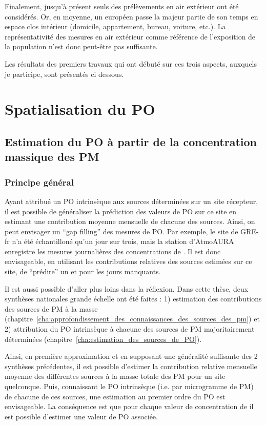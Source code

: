 Finalement, jusqu'à présent seuls des prélèvements en air extérieur ont été considérés.
Or, en moyenne, un européen passe la majeur partie de son temps en espace clos intérieur
(domicile, appartement, bureau, voiture, etc.).  La représentativité des mesures en air
extérieur comme référence de l'exposition de la population n'est donc peut-être pas
suffisante.

Les résultats des premiers travaux qui ont débuté sur ces trois aspects, auxquels je
participe, sont présentés ci dessous.

\section{Spatialisation du PO}

\subsection{Estimation du PO à partir de la concentration massique des PM}

\subsubsection{Principe général}

Ayant attribué un PO intrinsèque aux sources déterminées sur un site récepteur, il est
possible de généraliser la prédiction des valeurs de PO sur ce site en estimant une
contribution moyenne mensuelle de chacune des sources. Ainsi, on peut envisager un ``gap
filling'' des mesures de PO. Par exemple, le site de GRE-fr n'a été échantilloné qu'un
jour sur trois, mais la station d'AtmoAURA enregistre les mesures journalières des
concentrations de \PMdix. Il est donc envisageable, en utilisant les contributions
relatives des sources estimées sur ce site, de ``prédire'' un \POAAv{} et \PODTTv{} pour
les jours manquants.

Il est aussi possible d'aller plus loins dans la réflexion. Dans cette thèse, deux
synthèses nationales grande échelle ont été faites : 1) estimation des contributions des
sources de PM à la masse \autocite{weberComparison2019}
(chapitre~\ref{cha:approfondissement_des_connaissances_des_sources_des_pm}) et 2) attribution du PO intrinsèque à
chacune des sources de PM majoritairement déterminées \autocite{weberSourceinprep.}
(chapitre~\ref{cha:estimation_des_sources_de_PO}).

Ainsi, en première approximation et en supposant une généralité suffisante des 2
synthèses précédentes, il est possible d'estimer la contribution relative mensuelle
moyenne des différentes sources à la masse totale des PM pour un site quelconque.  Puis,
connaissant le PO intrinsèque (i.e. par microgramme de PM) de chacune de ces sources, une
estimation au premier ordre du PO est envisageable.  La conséquence est que pour chaque
valeur de concentration de \PMdix{} il est possible d'estimer une valeur de PO associée.

